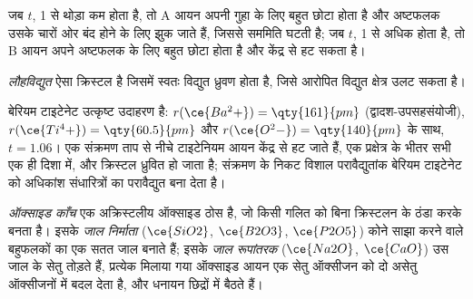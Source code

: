 जब $t$, 1 से थोड़ा कम होता है, तो A आयन अपनी गुहा के लिए बहुत छोटा होता है और
अष्टफलक उसके चारों ओर बंद होने के लिए झुक जाते हैं, जिससे सममिति घटती है; जब $t$, 1 से अधिक होता है,
तो B आयन अपने अष्टफलक के लिए बहुत छोटा होता है और केंद्र से हट सकता है।

\begin{definition}[लौहविद्युत]\label{def:b3:inorganic-materials:ferroelectric}
\emph{लौहविद्युत} ऐसा क्रिस्टल है जिसमें स्वतः
विद्युत ध्रुवण होता है, जिसे आरोपित विद्युत क्षेत्र उलट सकता है।
\end{definition}

बेरियम टाइटेनेट उत्कृष्ट उदाहरण है: $r(\ce{Ba^2+}) = \qty{161}{pm}$ (द्वादश-उपसहसंयोजी),
$r(\ce{Ti^4+}) = \qty{60.5}{pm}$ और $r(\ce{O^2-}) = \qty{140}{pm}$ के साथ, $t = 1.06$। एक संक्रमण ताप से नीचे
टाइटेनियम आयन केंद्र से हट जाते हैं, एक प्रक्षेत्र के भीतर सभी एक ही दिशा में,
और क्रिस्टल ध्रुवित हो जाता है; संक्रमण के निकट विशाल परावैद्युतांक
बेरियम टाइटेनेट को अधिकांश  संधारित्रों का परावैद्युत बना देता है।

\begin{definition}[ऑक्साइड काँच]\label{def:b3:inorganic-materials:glass}
\emph{ऑक्साइड काँच} एक अक्रिस्टलीय ऑक्साइड ठोस है, जो
किसी गलित को बिना क्रिस्टलन के ठंडा करके बनता है। इसके \emph{जाल
निर्माता} ($\ce{SiO2}$, $\ce{B2O3}$, $\ce{P2O5}$) कोने साझा करने वाले बहुफलकों का
एक सतत जाल बनाते हैं; इसके \emph{जाल रूपांतरक}
($\ce{Na2O}$, $\ce{CaO}$) उस जाल के सेतु तोड़ते हैं, प्रत्येक मिलाया गया ऑक्साइड आयन एक
सेतु ऑक्सीजन को दो असेतु ऑक्सीजनों में बदल देता है, और धनायन
छिद्रों में बैठते हैं।
\end{definition}

